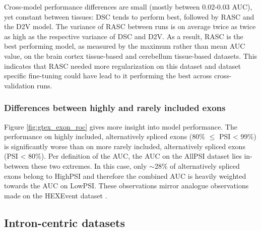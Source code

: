 Cross-model performance differences are small (mostly between 0.02-0.03 AUC), yet constant between tissues: DSC tends to perform best, followed by RASC and the D2V model. The variance of RASC between runs is on average twice as twice as high as the respective variance of DSC and D2V. As a result, RASC is the best performing model, as measured by the maximum rather than mean AUC value, on the brain cortex tissue-based and cerebellum tissue-based datasets. This indicates that RASC needed more regularization on this dataset and dataset specific fine-tuning could have lead to it performing the best across cross-validation runs.

\subsubsection{Differences between highly and rarely included exons}
Figure \ref{fig:gtex_exon_roc} gives more insight into model performance. 
The performance on highly included, alternatively spliced exons (80\% $\leq$ PSI < 99\%) is significantly worse than on more rarely included, alternatively spliced exons (PSI < 80\%). Per definition of the AUC, the AUC on the AllPSI dataset lies in-between these two extremes. In this case, only $\sim$28\% of alternatively spliced exons belong to HighPSI and therefore the combined AUC is heavily weighted towards the AUC on LowPSI. These observations mirror analogue observations made on the HEXEvent dataset \cite{dsc}.



%	




	
	
	

\subsection{Intron-centric datasets} \label{subsec:gtex_junc}

